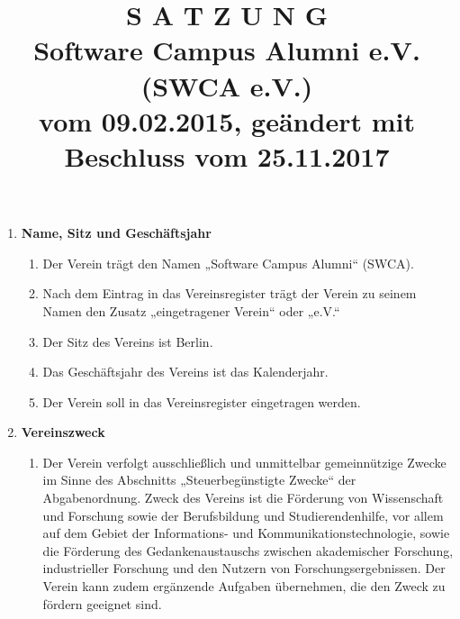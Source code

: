 \documentclass{article}
\title{\textsf{\textbf{S A T Z U N G}}\\
\small\textbf{Software Campus Alumni e.V. (SWCA e.V.)}\\
vom 09.02.2015, geändert mit Beschluss vom 25.11.2017}
\author{}
\date{}
\begin{document}
\maketitle

\begin{enumerate}[§ 1.]

\item \textsf{\textbf{Name, Sitz und Geschäftsjahr}}
	\begin{enumerate}[1.]
	\item Der Verein trägt den Namen „Software Campus Alumni“ (SWCA).
	\item Nach dem Eintrag in das Vereinsregister trägt der Verein zu seinem Namen den Zusatz „eingetragener Verein“ oder „e.V.“
	\item Der Sitz des Vereins ist Berlin.
	\item Das Geschäftsjahr des Vereins ist das Kalenderjahr.
	\item Der Verein soll in das Vereinsregister eingetragen werden.
	\end{enumerate}

\item \textsf{\textbf{Vereinszweck}}
	\begin{enumerate}[1.]
	\item Der Verein verfolgt ausschließlich und unmittelbar gemeinnützige Zwecke im Sinne des Abschnitts „Steuerbegünstigte Zwecke“ der Abgabenordnung.
	Zweck des Vereins ist die Förderung von Wissenschaft und Forschung sowie der Berufsbildung und Studierendenhilfe, vor allem auf dem Gebiet der Informations- und Kommunikationstechnologie, sowie die Förderung des Gedankenaustauschs zwischen akademischer Forschung, industrieller Forschung und den Nutzern von Forschungsergebnissen.
	Der Verein kann zudem ergänzende Aufgaben übernehmen, die den Zweck zu fördern geeignet sind.


\end{enumerate}
\end{enumerate}
\end{document}
